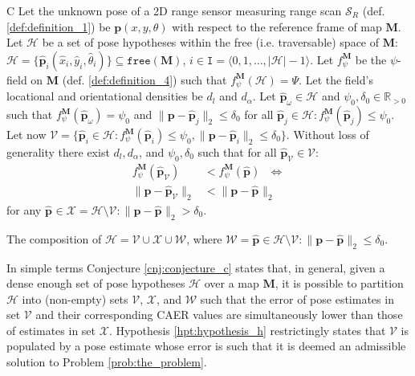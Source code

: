 \begin{customcnj}{C}
  \label{cnj:conjecture_c}
  Let the unknown pose of a 2D range sensor measuring range scan $\mathcal{S}_R$
  (def. \ref{def:definition_1}) be $\bm{p}(x,y,\theta)$ with respect to the
  reference frame of map $\bm{M}$.
  Let $\mathcal{H}$ be a set of pose hypotheses within the free (i.e.
  traversable) space of $\bm{M}$:
  $\mathcal{H} = \{\hat{\bm{p}}_i(\hat{x}_i,\hat{y}_i,\hat{\theta}_i)\} \subseteq \texttt{free}(\bm{M})$,
  $i \in \texttt{I} = \langle 0,1,\dots,|\mathcal{H}|-1\rangle$.
  Let $f_{\psi}^{\bm{M}}$ be the $\psi$-field on $\bm{M}$
  (def. \ref{def:definition_4})
  such that $f_{\psi}^{\bm{M}}(\mathcal{H})= \Psi$.
  Let the field's locational and orientational densities be
  $d_{l}$ and $d_{\alpha}$.
  Let $\hat{\bm{p}}_\omega \in \mathcal{H}$ and $\psi_0,\delta_0 \in \mathbb{R}_{>0}$
  such that $f_{\psi}^{\bm{M}}(\hat{\bm{p}}_\omega ) = \psi_0$ and
  $\|\bm{p}-\hat{\bm{p}}_j\|_2 \leq \delta_0$ for all
  $\hat{\bm{p}}_j \in \mathcal{H}: f_{\psi}^{\bm{M}}(\hat{\bm{p}}_j) \leq \psi_0$.
  Let now $\mathcal{V} = \{\hat{\bm{p}}_i \in \mathcal{H}: f_{\psi}^{\bm{M}}(\hat{\bm{p}}_i) \leq \psi_0,
  \|\bm{p}-\hat{\bm{p}}_i\|_2 \leq \delta_0\}$.
  Without loss of generality there exist $d_{l}, d_{\alpha}$, and
  $\psi_0,\delta_0$ such that for all
  $\hat{\bm{p}}_\mathcal{V} \in \mathcal{V}$:
  \begin{align}
    f_{\psi}^{\bm{M}}(\hat{\bm{p}}_\mathcal{V}) &< f_{\psi}^{\bm{M}}(\hat{\bm{p}}) \ \ \ \Leftrightarrow \nonumber \\
    \|\bm{p}-\hat{\bm{p}}_\mathcal{V}\|_2 &< \|\bm{p}-\hat{\bm{p}}_{}\|_2 \nonumber
  \end{align}
  for any $\hat{\bm{p}}_{} \in \mathcal{X} = \mathcal{H} \setminus  \mathcal{V}: \|\bm{p}-\hat{\bm{p}}_{}\|_2 > \delta_0$.
\end{customcnj}

\begin{remark}
  \label{rem:remark_1}
  The composition of
  $\mathcal{H} = \mathcal{V} \cup \mathcal{X} \cup \mathcal{W}$, where
  $\mathcal{W} = \hat{\bm{p}} \in {\mathcal{H} \setminus \mathcal{V}}: \|\bm{p}-\hat{\bm{p}}\|_2 \leq \delta_0$.
\end{remark}

In simple terms Conjecture \ref{cnj:conjecture_c} states that, in general,
given a dense enough set of pose hypotheses $\mathcal{H}$ over a map $\bm{M}$,
it is possible to partition $\mathcal{H}$ into (non-empty) sets $\mathcal{V}$,
$\mathcal{X}$, and $\mathcal{W}$ such that the error of pose estimates in set
$\mathcal{V}$ and their corresponding CAER values are simultaneously lower than
those of estimates in set $\mathcal{X}$. Hypothesis \ref{hpt:hypothesis_h}
restrictingly states that $\mathcal{V}$ is populated by a pose estimate
whose error is such that it is deemed an admissible solution to
Problem \ref{prob:the_problem}.



